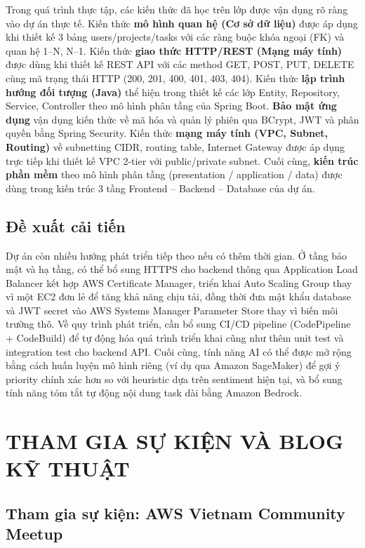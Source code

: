 \documentclass[13pt]{extarticle}
\begin{document}
Trong quá trình thực tập, các kiến thức đã học trên lớp được vận dụng rõ
ràng vào dự án thực tế. Kiến thức \textbf{mô hình quan hệ (Cơ sở dữ liệu)}
được áp dụng khi thiết kế 3 bảng users/projects/tasks với các ràng buộc khóa
ngoại (FK) và quan hệ 1--N, N--1. Kiến thức \textbf{giao thức HTTP/REST (Mạng
máy tính)} được dùng khi thiết kế REST API với các method GET, POST, PUT,
DELETE cùng mã trạng thái HTTP (200, 201, 400, 401, 403, 404). Kiến thức
\textbf{lập trình hướng đối tượng (Java)} thể hiện trong thiết kế các lớp
Entity, Repository, Service, Controller theo mô hình phân tầng của Spring
Boot. \textbf{Bảo mật ứng dụng} vận dụng kiến thức về mã hóa và quản lý phiên
qua BCrypt, JWT và phân quyền bằng Spring Security. Kiến thức \textbf{mạng
máy tính (VPC, Subnet, Routing)} về subnetting CIDR, routing table, Internet
Gateway được áp dụng trực tiếp khi thiết kế VPC 2-tier với public/private
subnet. Cuối cùng, \textbf{kiến trúc phần mềm} theo mô hình phân tầng
(presentation / application / data) được dùng trong kiến trúc 3 tầng
Frontend -- Backend -- Database của dự án.

\subsection{Đề xuất cải tiến}

Dự án còn nhiều hướng phát triển tiếp theo nếu có thêm thời gian. Ở tầng
bảo mật và hạ tầng, có thể bổ sung HTTPS cho backend thông qua Application
Load Balancer kết hợp AWS Certificate Manager, triển khai Auto Scaling Group
thay vì một EC2 đơn lẻ để tăng khả năng chịu tải, đồng thời đưa mật khẩu
database và JWT secret vào AWS Systems Manager Parameter Store thay vì biến
môi trường thô. Về quy trình phát triển, cần bổ sung CI/CD pipeline
(CodePipeline + CodeBuild) để tự động hóa quá trình triển khai cũng như thêm
unit test và integration test cho backend API. Cuối cùng, tính năng AI có
thể được mở rộng bằng cách huấn luyện mô hình riêng (ví dụ qua Amazon
SageMaker) để gợi ý priority chính xác hơn so với heuristic dựa trên
sentiment hiện tại, và bổ sung tính năng tóm tắt tự động nội dung task dài
bằng Amazon Bedrock.

\newpage

\section{THAM GIA SỰ KIỆN VÀ BLOG KỸ THUẬT}

\subsection{Tham gia sự kiện: AWS Vietnam Community Meetup}
\end{document}
